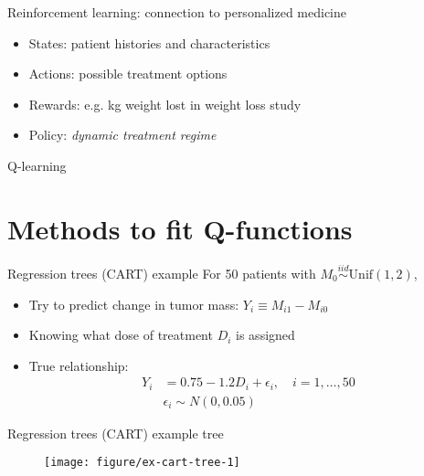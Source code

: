 \documentclass[handout]{beamer}
\begin{document}
\begin{frame}[c]{Reinforcement learning: connection to personalized medicine}
  
  \begin{itemize}
      \item States: patient histories and characteristics
      \item Actions: possible treatment options
      \item Rewards: e.g. kg weight lost in weight loss study 
      \item Policy: \emph{dynamic treatment regime} 
  \end{itemize}

\end{frame}

\begin{frame}[t]{Q-learning}
  
\end{frame}



\section{Methods to fit Q-functions} %
\label{sec:methods_to_fit_q_functions}

\begin{frame}{Regression trees (CART) example}
  For 50 patients with $M_{0} \overset{iid}{\sim} \text{Unif}(1, 2)$,
  \begin{itemize}%
    \item Try to predict change in tumor mass: $Y_{i} \equiv M_{i1} - M_{i0}$
    \item Knowing what dose of treatment $D_{i}$ is assigned
    \item True relationship:
    \begin{align*}
      Y_{i} &= 0.75 - 1.2 D_{i} + \epsilon_{i}, \quad i = 1, \ldots, 50 \\
      & \epsilon_{i} \sim N(0, 0.05)
    \end{align*}
     
  \end{itemize}
  
\end{frame}

\begin{frame}[c]{Regression trees (CART) example tree}
  \begin{figure}[!htbp]
  \begin{center}
    \texttt{[image: figure/ex-cart-tree-1]}
  \end{center}
  \end{figure}
\end{frame}
\end{document}
